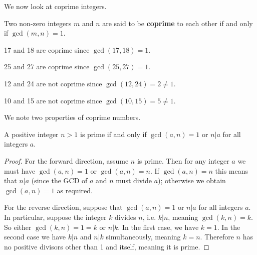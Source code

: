 We now look at coprime integers.
\begin{definition}
    Two non-zero integers $m$ and $n$ are said to be \textbf{coprime} to each other if and only if $\gcd(m, n) = 1$.
\end{definition}
\begin{example}
    17 and 18 are coprime since $\gcd(17, 18) = 1$.
\end{example}
\begin{example}
    25 and 27 are coprime since $\gcd(25, 27) = 1$.
\end{example}
\begin{example}
    12 and 24 are not coprime since $\gcd(12, 24) = 2 \neq 1$.
\end{example}
\begin{example}
    10 and 15 are not coprime since $\gcd(10, 15) = 5 \neq 1$.
\end{example}

We note two properties of coprime numbers.
\begin{proposition}\label{prop-prime-is-coprime-or-divisor}
    A positive integer $n > 1$ is prime if and only if $\gcd(a,n) = 1$ or $n \vert a$ for all integers $a$.
\end{proposition}
\begin{proof}
    For the forward direction, assume $n$ is prime. Then for any integer $a$ we must have $\gcd(a, n) = 1$ or $\gcd(a, n) = n$. If $\gcd(a,n) = n$ this means that $n \vert a$ (since the GCD of $a$ and $n$ must divide $a$); otherwise we obtain $\gcd(a,n) = 1$ as required.

    For the reverse direction, suppose that $\gcd(a,n) = 1$ or $n \vert a$ for all integers $a$. In particular, suppose the integer $k$ divides $n$, i.e. $k \vert n$, meaning $\gcd(k, n) = k$. So either $\gcd(k,n) = 1 = k$ or $n \vert k$. In the first case, we have $k = 1$. In the second case we have $k \vert n$ and $n \vert k$ simultaneously, meaning $k = n$. Therefore $n$ has no positive divisors other than 1 and itself, meaning it is prime.
\end{proof}

